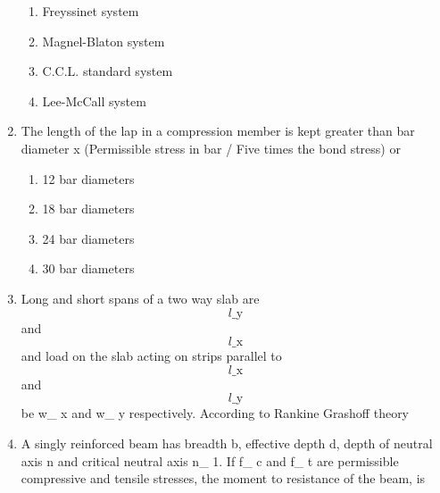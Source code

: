 \documentclass[11pt,a4paper]{article}
\begin{document}
\begin{enumerate}
\begin{enumerate}[label=\Alph*.]
\item{Freyssinet system}
\item{Magnel-Blaton system}
\item{C.C.L. standard system}
\item{Lee-McCall system}
\end{enumerate}
\item{The length of the lap in a compression member is kept greater than bar diameter x (Permissible stress in bar / Five times the bond stress) or}
\begin{enumerate}[label=\Alph*.]
\item{12 bar diameters}
\item{18 bar diameters}
\item{24 bar diameters}
\item{30 bar diameters}
\end{enumerate}
\item{Long and short spans of a two way slab are $${l\_{\text{y}}}$$ and $${l\_{\text{x}}}$$ and load on the slab acting on strips parallel to $${l\_{\text{x}}}$$ and $${l\_{\text{y}}}$$ be w\_ x and w\_ y respectively. According to Rankine Grashoff theory}
\\
\item{A singly reinforced beam has breadth b, effective depth d, depth of neutral axis n and critical neutral axis n\_ 1. If f\_ c and f\_ t are permissible compressive and tensile stresses, the moment to resistance of the beam, is}
\\
\end{enumerate}
\end{document}
